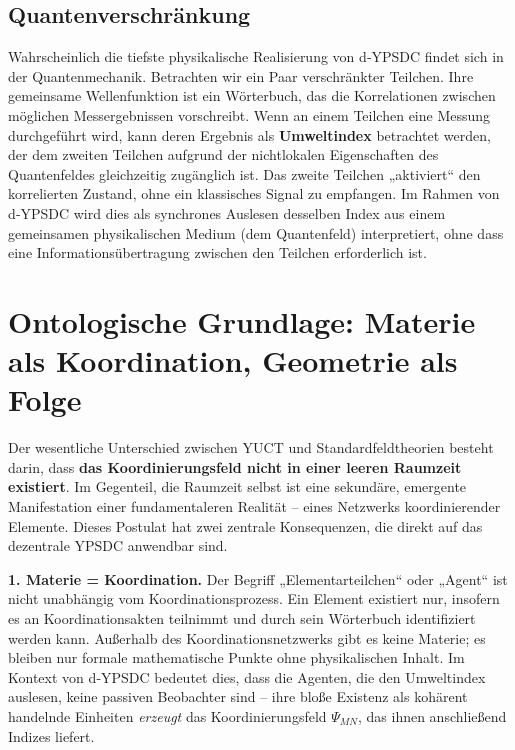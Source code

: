 \documentclass[12pt,a4paper]{article}
\begin{document}
	\subsection{Quantenverschränkung}
	
	Wahrscheinlich die tiefste physikalische Realisierung von d‑YPSDC findet sich in der Quantenmechanik. Betrachten wir ein Paar verschränkter Teilchen. Ihre gemeinsame Wellenfunktion ist ein Wörterbuch, das die Korrelationen zwischen möglichen Messergebnissen vorschreibt. Wenn an einem Teilchen eine Messung durchgeführt wird, kann deren Ergebnis als \textbf{Umweltindex} betrachtet werden, der dem zweiten Teilchen aufgrund der nichtlokalen Eigenschaften des Quantenfeldes gleichzeitig zugänglich ist. Das zweite Teilchen „aktiviert“ den korrelierten Zustand, ohne ein klassisches Signal zu empfangen. Im Rahmen von d‑YPSDC wird dies als synchrones Auslesen desselben Index aus einem gemeinsamen physikalischen Medium (dem Quantenfeld) interpretiert, ohne dass eine Informationsübertragung zwischen den Teilchen erforderlich ist.
	
	\section{Ontologische Grundlage: Materie als Koordination, Geometrie als Folge}
	
	Der wesentliche Unterschied zwischen YUCT und Standardfeldtheorien besteht darin, dass \textbf{das Koordinierungsfeld nicht in einer leeren Raumzeit existiert}. Im Gegenteil, die Raumzeit selbst ist eine sekundäre, emergente Manifestation einer fundamentaleren Realität – eines Netzwerks koordinierender Elemente. Dieses Postulat hat zwei zentrale Konsequenzen, die direkt auf das dezentrale YPSDC anwendbar sind.
	
	\textbf{1. Materie = Koordination.} Der Begriff „Elementarteilchen“ oder „Agent“ ist nicht unabhängig vom Koordinationsprozess. Ein Element existiert nur, insofern es an Koordinationsakten teilnimmt und durch sein Wörterbuch identifiziert werden kann. Außerhalb des Koordinationsnetzwerks gibt es keine Materie; es bleiben nur formale mathematische Punkte ohne physikalischen Inhalt. Im Kontext von d‑YPSDC bedeutet dies, dass die Agenten, die den Umweltindex auslesen, keine passiven Beobachter sind – ihre bloße Existenz als kohärent handelnde Einheiten \emph{erzeugt} das Koordinierungsfeld \(\Psi_{MN}\), das ihnen anschließend Indizes liefert.
	
\end{document}
